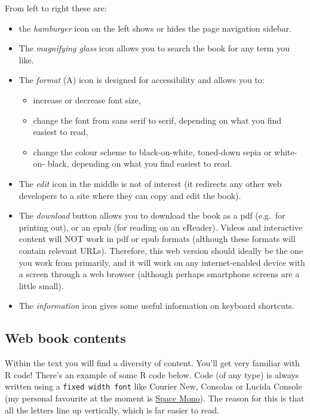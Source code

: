\documentclass[
]{book}
\providecommand{\tightlist}{%
  \setlength{\itemsep}{0pt}\setlength{\parskip}{0pt}}
\begin{document}
From left to right these are:

\begin{itemize}
\tightlist
\item
  the \emph{hamburger} icon on the left shows or hides the page navigation
  sidebar.
\item
  The \emph{magnifying glass} icon allows you to search the book for any
  term you like.
\item
  The \emph{format} (A) icon is designed for accessibility and allows you to:

  \begin{itemize}
  \tightlist
  \item
    increase or decrease font size,
  \item
    change the font from sans serif to serif, depending on what you find easiest
    to read,
  \item
    change the colour scheme to black-on-white, toned-down sepia or white-on-
    black, depending on what you find easiest to read.
  \end{itemize}
\item
  The \emph{edit} icon in the middle is not of interest (it redirects any
  other web developers to a site where they can copy and edit the book).
\item
  The \emph{download}
  button allows you to download the book as a pdf (e.g.~for printing out), or an epub
  (for reading on an eReader). Videos and interactive content will NOT work in pdf
  or epub formats (although these formats will contain relevant URLs). Therefore,
  this web version should ideally be the one you work from primarily, and it will work
  on any internet-enabled device with a screen through a web browser (although
  perhaps smartphone screens are a little small).
\item
  The \emph{information} icon gives
  some useful information on keyboard shortcuts.
\end{itemize}

\hypertarget{web-book-contents}{%
\subsection{Web book contents}\label{web-book-contents}}

Within the text you will find a diversity of content. You'll get very familiar
with R code! There's an example of some R code below. Code (of any type)
is always written using a \texttt{fixed\ width\ font} like Courier New, Consolas or
Lucida Console (my personal favourite at the moment is
\href{https://fonts.google.com/specimen/Space+Mono}{Space Mono}). The reason for this
is that all the letters line up vertically, which is far easier to read.
\end{document}
